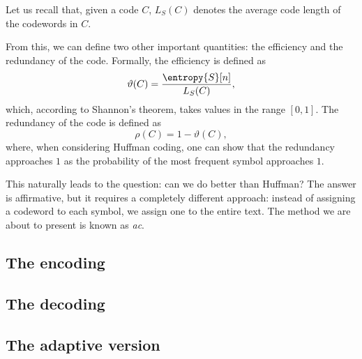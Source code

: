 \documentclass{subfiles}
\begin{document}
    Let us recall that, given a code \(C\), 
    \(L_{S}(C)\) denotes the average code length of the codewords in \(C\).

    From this, we can define two other important quantities: 
        the efficiency and the redundancy of the code.
        Formally, the efficiency is defined as 
        \[
            \vartheta(C) = \frac{\entropy{S}[n]}{L_{S}(C)},
        \]
        which, according to Shannon's theorem, takes values in the range \([0, 1]\).
        The redundancy of the code is defined as 
        \[
            \rho(C) = 1 - \vartheta(C),
        \]
        where, when considering Huffman coding, 
            one can show that the redundancy approaches \(1\) as the probability 
            of the most frequent symbol approaches \(1\).

        This naturally leads to the question: can we do better than Huffman?
            The answer is affirmative, but it requires a completely different approach:
            instead of assigning a codeword to each symbol, we assign one to the entire text.
            The method we are about to present is known as \emph{\gls{ac}}.

        \subsection{The encoding}
        

        \subsection{The decoding}
        
       
        \subsection{The adaptive version}
        
        
\end{document}
